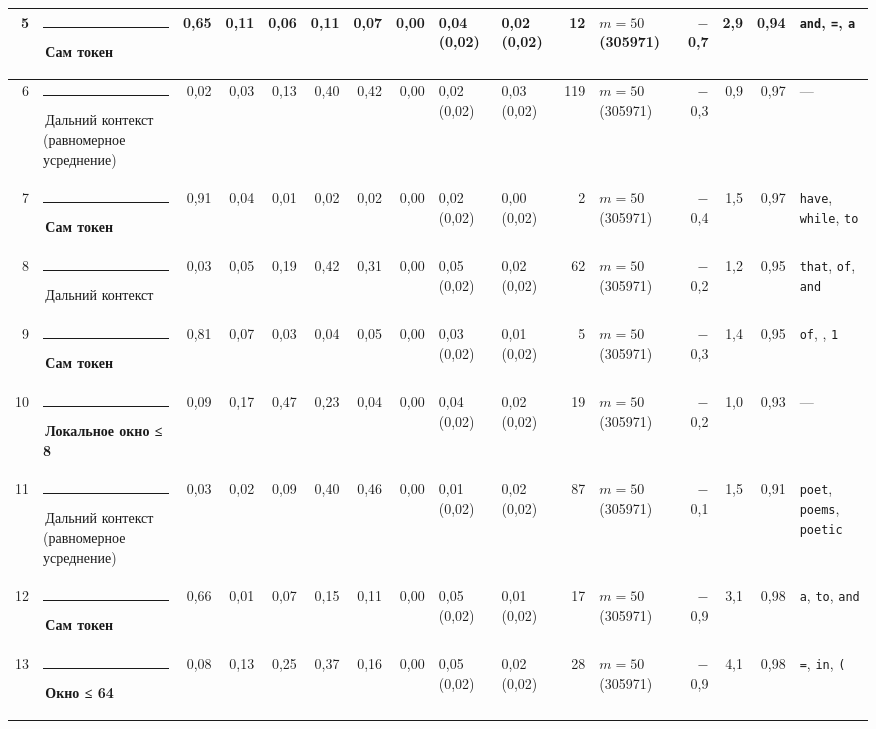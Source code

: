 \documentclass[10pt]{article}
\begin{document}
\begin{minipage}{\linewidth}
\begin{center}
{\begin{tabular}{|r|l|r|r|r|r|r|r|l|l|r|l|r|r|r|l|}
5 & \textcolor[HTML]{2A78D6}{\rule{0.62em}{0.62em}}\,\textbf{Сам токен} & 0,65 & 0,11 & 0,06 & 0,11 & 0,07 & 0,00 & 0,04 (0,02) & 0,02 (0,02) & 12 & $m{=}50$ (305971) & $-$0,7 & 2,9 & 0,94 & \texttt{\textvisiblespace{}and}, \texttt{\textvisiblespace{}=}, \texttt{\textvisiblespace{}a} \\ \hline
6 & \textcolor[HTML]{C3C2B7}{\rule{0.62em}{0.62em}}\,Дальний контекст (равномерное усреднение) & 0,02 & 0,03 & 0,13 & 0,40 & 0,42 & 0,00 & 0,02 (0,02) & 0,03 (0,02) & 119 & $m{=}50$ (305971) & $-$0,3 & 0,9 & 0,97 & — \\ \hline
7 & \textcolor[HTML]{2A78D6}{\rule{0.62em}{0.62em}}\,\textbf{Сам токен} & 0,91 & 0,04 & 0,01 & 0,02 & 0,02 & 0,00 & 0,02 (0,02) & 0,00 (0,02) & 2 & $m{=}50$ (305971) & $-$0,4 & 1,5 & 0,97 & \texttt{\textvisiblespace{}have}, \texttt{\textvisiblespace{}while}, \texttt{\textvisiblespace{}to} \\ \hline
8 & \textcolor[HTML]{C3C2B7}{\rule{0.62em}{0.62em}}\,Дальний контекст & 0,03 & 0,05 & 0,19 & 0,42 & 0,31 & 0,00 & 0,05 (0,02) & 0,02 (0,02) & 62 & $m{=}50$ (305971) & $-$0,2 & 1,2 & 0,95 & \texttt{\textvisiblespace{}that}, \texttt{\textvisiblespace{}of}, \texttt{\textvisiblespace{}and} \\ \hline
9 & \textcolor[HTML]{2A78D6}{\rule{0.62em}{0.62em}}\,\textbf{Сам токен} & 0,81 & 0,07 & 0,03 & 0,04 & 0,05 & 0,00 & 0,03 (0,02) & 0,01 (0,02) & 5 & $m{=}50$ (305971) & $-$0,3 & 1,4 & 0,95 & \texttt{\textvisiblespace{}of}, \texttt{\textvisiblespace{}}, \texttt{1} \\ \hline
10 & \textcolor[HTML]{1BAF7A}{\rule{0.62em}{0.62em}}\,\textbf{Локальное окно ≤ 8} & 0,09 & 0,17 & 0,47 & 0,23 & 0,04 & 0,00 & 0,04 (0,02) & 0,02 (0,02) & 19 & $m{=}50$ (305971) & $-$0,2 & 1,0 & 0,93 & — \\ \hline
11 & \textcolor[HTML]{C3C2B7}{\rule{0.62em}{0.62em}}\,Дальний контекст (равномерное усреднение) & 0,03 & 0,02 & 0,09 & 0,40 & 0,46 & 0,00 & 0,01 (0,02) & 0,02 (0,02) & 87 & $m{=}50$ (305971) & $-$0,1 & 1,5 & 0,91 & \texttt{\textvisiblespace{}poet}, \texttt{\textvisiblespace{}poems}, \texttt{\textvisiblespace{}poetic} \\ \hline
12 & \textcolor[HTML]{2A78D6}{\rule{0.62em}{0.62em}}\,\textbf{Сам токен} & 0,66 & 0,01 & 0,07 & 0,15 & 0,11 & 0,00 & 0,05 (0,02) & 0,01 (0,02) & 17 & $m{=}50$ (305971) & $-$0,9 & 3,1 & 0,98 & \texttt{\textvisiblespace{}a}, \texttt{\textvisiblespace{}to}, \texttt{\textvisiblespace{}and} \\ \hline
13 & \textcolor[HTML]{EDA100}{\rule{0.62em}{0.62em}}\,\textbf{Окно ≤ 64} & 0,08 & 0,13 & 0,25 & 0,37 & 0,16 & 0,00 & 0,05 (0,02) & 0,02 (0,02) & 28 & $m{=}50$ (305971) & $-$0,9 & 4,1 & 0,98 & \texttt{\textvisiblespace{}=}, \texttt{\textvisiblespace{}in}, \texttt{\textvisiblespace{}(} \\ \hline

\end{tabular}}
\end{center}
\end{minipage}
\end{document}
